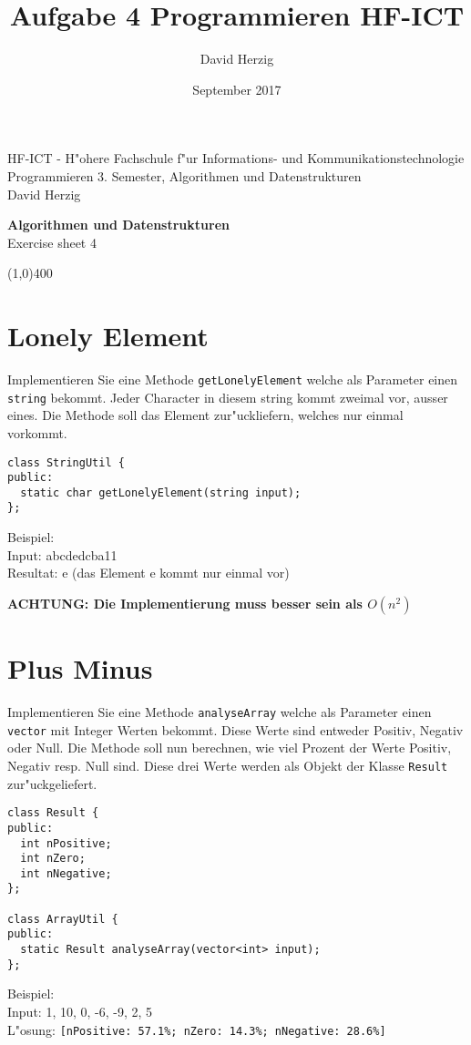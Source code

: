 \documentclass[a4paper,10pt]{article}
\title{Aufgabe 4 Programmieren HF-ICT}
\author{David Herzig}
\date{September 2017}
\begin{document}
HF-ICT - H"ohere Fachschule f"ur Informations- und Kommunikationstechnologie\\
Programmieren 3. Semester, Algorithmen und Datenstrukturen\\
David Herzig

\vspace{2mm}

\begin{center}
{\Large \bf Algorithmen und Datenstrukturen}\\
Exercise sheet 4
\end{center}

\vspace{2mm}

\line(1,0){400}

\vspace{5mm}

\section{Lonely Element}
Implementieren Sie eine Methode \verb|getLonelyElement| welche als
Parameter einen \verb|string| bekommt. Jeder Character in diesem
string kommt zweimal vor, ausser eines. Die Methode soll das
Element zur"uckliefern, welches nur einmal vorkommt.

\begin{lstlisting}
class StringUtil {
public:
  static char getLonelyElement(string input);
};
\end{lstlisting}

Beispiel:\\
Input: abcdedcba11\\
Resultat: e (das Element e kommt nur einmal vor)

\vspace{3mm}

{\bf ACHTUNG: Die Implementierung muss besser sein als $O(n^2)$}

\section{Plus Minus}
Implementieren Sie eine Methode \verb|analyseArray| welche als Parameter
einen \verb|vector| mit Integer Werten bekommt. Diese Werte sind entweder
Positiv, Negativ oder Null. Die Methode soll nun berechnen, wie viel Prozent
der Werte Positiv, Negativ resp. Null sind. Diese drei Werte werden als
Objekt der Klasse \verb|Result| zur"uckgeliefert.

\begin{lstlisting}
class Result {
public:
  int nPositive;
  int nZero;
  int nNegative;
};

class ArrayUtil {
public:
  static Result analyseArray(vector<int> input);
};
\end{lstlisting}

Beispiel:\\
Input: {1, 10, 0, -6, -9, 2, 5}\\
L"osung: \verb|[nPositive: 57.1%; nZero: 14.3%; nNegative: 28.6%]|
\end{document}
